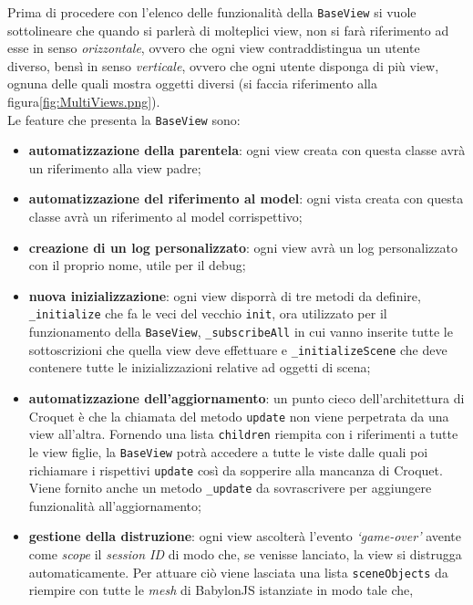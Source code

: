 Prima di procedere con l'elenco delle funzionalità della \texttt{BaseView} si vuole sottolineare che quando si parlerà di molteplici view, non si farà riferimento ad esse in senso
\textit{orizzontale}, ovvero che ogni view contraddistingua un utente diverso, bensì in senso \textit{verticale}, ovvero che ogni utente disponga di più view, ognuna delle quali mostra
oggetti diversi (si faccia riferimento alla figura\ref{fig:MultiViews.png}).\\
Le feature che presenta la \texttt{BaseView} sono:
\begin{itemize}
    \item \textbf{automatizzazione della parentela}: ogni view creata con questa classe avrà un riferimento alla view padre;
    \item \textbf{automatizzazione del riferimento al model}: ogni vista creata con questa classe avrà un riferimento al model corrispettivo;
    \item \textbf{creazione di un log personalizzato}: ogni view avrà un log personalizzato con il proprio nome, utile per il debug;
    \item \textbf{nuova inizializzazione}: ogni view disporrà di tre metodi da definire, \texttt{\_initialize} che fa le veci del vecchio \texttt{init}, ora utilizzato per il funzionamento
    della \texttt{BaseView}, \texttt{\_subscribeAll} in cui vanno inserite tutte le sottoscrizioni che quella view deve effettuare e \texttt{\_initializeScene} che deve contenere tutte le
    inizializzazioni relative ad oggetti di scena;
    \item \textbf{automatizzazione dell'aggiornamento}: un punto cieco dell'architettura di Croquet è che la chiamata del metodo \texttt{update} non viene perpetrata da una view all'altra.
    Fornendo una lista \texttt{children} riempita con i riferimenti a tutte le view figlie, la \texttt{BaseView} potrà accedere a tutte le viste dalle quali poi richiamare i rispettivi
    \texttt{update} così da sopperire alla mancanza di Croquet. Viene fornito anche un metodo \texttt{\_update} da sovrascrivere per aggiungere funzionalità all'aggiornamento;
    \item \textbf{gestione della distruzione}: ogni view ascolterà l'evento \textit{`game-over'} avente come \textit{scope} il \textit{session ID} di modo che, se venisse lanciato, la view
    si distrugga automaticamente. Per attuare ciò viene lasciata una lista \texttt{sceneObjects} da riempire con tutte le \textit{mesh} di BabylonJS istanziate in modo tale che,

\end{itemize}
